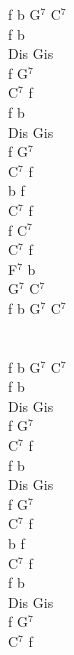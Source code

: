 \documentclass[a5paper, 10pt]{book}
\begin{document}
\begin{minipage}[t]{0.2\textwidth}
 f b G$^7$ C$^7$\\
 
 f b\\
 Dis Gis\\
 f G$^7$\\
 C$^7$ f\\

 f b\\
 Dis Gis\\
 f G$^7$\\
 C$^7$ f\\
 
 b f\\
 C$^7$ f\\
 
 f C$^7$\\
 C$^7$ f\\
 F$^7$ b\\
 G$^7$ C$^7$\\
 f b G$^7$ C$^7$\\
 \\
 \\
  f b G$^7$ C$^7$\\

   f b\\
 Dis Gis\\
 f G$^7$\\
 C$^7$ f\\

 f b\\
 Dis Gis\\
 f G$^7$\\
 C$^7$ f\\

 b f\\
 C$^7$ f\\
 
 f b\\
 Dis Gis\\
 f G$^7$\\
 C$^7$ f\\
\end{minipage}

\newpage
\end{document}
